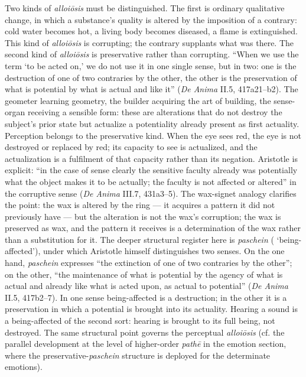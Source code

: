 Two kinds of \textit{alloiōsis} must be distinguished. The first is ordinary qualitative change, in which a substance's quality is altered by the imposition of a contrary: cold water becomes hot, a living body becomes diseased, a flame is extinguished. This kind of \textit{alloiōsis} is corrupting; the contrary supplants what was there. The second kind of \textit{alloiōsis} is preservative rather than corrupting. ``When we use the term `to be acted on,' we do not use it in one single sense, but in two: one is the destruction of one of two contraries by the other, the other is the preservation of what is potential by what is actual and like it'' (\textit{De Anima} II.5, 417a21--b2). The geometer learning geometry, the builder acquiring the art of building, the sense-organ receiving a sensible form: these are alterations that do not destroy the subject's prior state but actualize a potentiality already present as first actuality. Perception belongs to the preservative kind. When the eye sees red, the eye is not destroyed or replaced by red; its capacity to see is actualized, and the actualization is a fulfilment of that capacity rather than its negation. Aristotle is explicit: ``in the case of sense clearly the sensitive faculty already was potentially what the object makes it to be actually; the faculty is not affected or altered'' in the corruptive sense (\textit{De Anima} III.7, 431a3--5). The wax-signet analogy clarifies the point: the wax is altered by the ring --- it acquires a pattern it did not previously have --- but the alteration is not the wax's corruption; the wax is preserved as wax, and the pattern it receives is a determination of the wax rather than a substitution for it. The deeper structural register here is \textit{paschein} ( `being-affected'), under which Aristotle himself distinguishes two senses. On the one hand, \textit{paschein} expresses ``the extinction of one of two contraries by the other''; on the other, ``the maintenance of what is potential by the agency of what is actual and already like what is acted upon, as actual to potential'' (\textit{De Anima} II.5, 417b2--7). In one sense being-affected is a destruction; in the other it is a preservation in which a potential is brought into its actuality. Hearing a sound is a being-affected of the second sort: hearing is brought to its full being, not destroyed. The same structural point governs the perceptual \textit{alloiōsis} (cf. the parallel development at the level of higher-order \textit{pathē} in the emotion section, where the preservative-\textit{paschein} structure is deployed for the determinate emotions).

